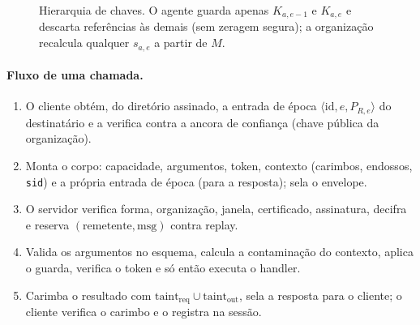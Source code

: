 \documentclass[11pt,a4paper]{article}
\theoremstyle{plain}
\theoremstyle{definition}
\theoremstyle{remark}
\newcommand{\taint}{\mathrm{taint}}
\newcommand{\cod}[1]{\texttt{#1}}
\begin{document}
\begin{figure}[h!]
\centering
{}
\caption{Hierarquia de chaves. O agente guarda apenas $K_{a,e-1}$ e $K_{a,e}$ e descarta referências às demais (sem zeragem segura); a organização recalcula qualquer $s_{a,e}$ a partir de $M$.}
\end{figure}

\paragraph{Fluxo de uma chamada.}
\begin{enumerate}
  \item O cliente obtém, do diretório assinado, a entrada de época $\langle \text{id}, e, P_{R,e}\rangle$ do destinatário e a verifica contra a ancora de confiança (chave pública da organização).
  \item Monta o corpo: capacidade, argumentos, token, contexto (carimbos, endossos, \cod{sid}) e a própria entrada de época (para a resposta); sela o envelope.
  \item O servidor verifica forma, organização, janela, certificado, assinatura, decifra e reserva $(\text{remetente},\text{msg})$ contra replay.
  \item Valida os argumentos no esquema, calcula a contaminação do contexto, aplica o guarda, verifica o token e só então executa o handler.
  \item Carimba o resultado com $\taint_{\text{req}}\cup\taint_{\text{out}}$, sela a resposta para o cliente; o cliente verifica o carimbo e o registra na sessão.
\end{enumerate}
\end{document}
